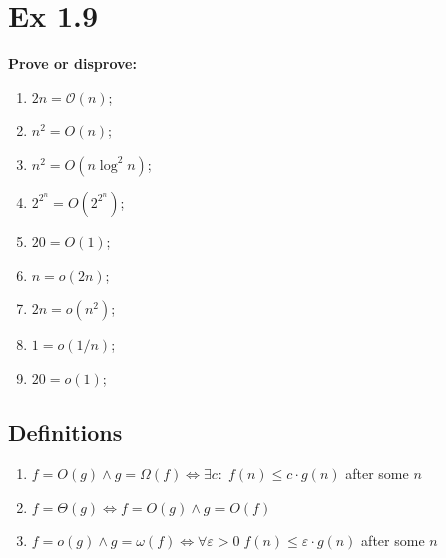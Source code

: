 \section*{Ex 1.9}
\begin{mdframed}
	\textbf{Prove or disprove:}
	\begin{enumerate}
        \item $2n = \mathcal{O}(n)$;
        \item $n^2 = O(n)$;
        \item $n^2 = O(n \log^2 n)$;
        \item $2^{2^n} = O(2^{2^n})$;
        \item $20 = O(1)$;
        \item $n = o(2n)$;
        \item $2n = o(n^2)$;
        \item $1 = o(1/n)$;
        \item $20 = o(1)$;
    \end{enumerate}
\end{mdframed}

\subsection*{Definitions}
\begin{enumerate}
    \item $f = O(g) \wedge g = \Omega(f)  \iff \exists c :\; f(n) \le c \cdot g(n)$ after some $n$
    \item $f = \Theta(g) \iff f = O(g) \wedge g = O(f)$
    \item $f = o(g) \wedge g = \omega(f) \iff \forall \varepsilon > 0 \; f(n) \le \varepsilon \cdot g(n)$ after some $n$
\end{enumerate} 


